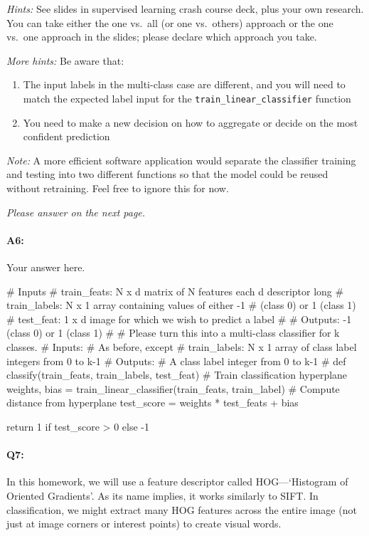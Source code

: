 \emph{Hints:} See slides in supervised learning crash course deck, plus your own research. You can take either the one vs.~all (or one vs.~others) approach or the one vs.~one approach in the slides; please declare which approach you take.

\emph{More hints:} Be aware that:
\begin{enumerate}
    \item The input labels in the multi-class case are different, and you will need to match the expected label input for the \texttt{train\_linear\_classifier} function
    \item You need to make a new decision on how to aggregate or decide on the most confident prediction
\end{enumerate}

\emph{Note:} A more efficient software application would separate the classifier training and testing into two different functions so that the model could be reused without retraining. Feel free to ignore this for now.

\emph{Please answer on the next page.}

\pagebreak
\paragraph{A6:} Your answer here.

\begin{python}
# Inputs
#   train_feats: N x d matrix of N features each d descriptor long
#   train_labels: N x 1 array containing values of either -1 
#               (class 0) or 1 (class 1)
#   test_feat: 1 x d image for which we wish to predict a label
#
#   Outputs: -1 (class 0) or 1 (class 1)
#
# Please turn this into a multi-class classifier for k classes.
# Inputs:
#    As before, except
#    train_labels: N x 1 array of class label integers from 0 to k-1
# Outputs:
#    A class label integer from 0 to k-1
#
def classify(train_feats, train_labels, test_feat)
    # Train classification hyperplane
    weights, bias = train_linear_classifier(train_feats, train_label)
    # Compute distance from hyperplane
    test_score = weights * test_feats + bias

    return 1 if test_score > 0 else -1
\end{python}


\pagebreak

\paragraph{Q7:} In this homework, we will use a feature descriptor called HOG---`Histogram of Oriented Gradients'. As its name implies, it works similarly to SIFT. In classification, we might extract many HOG features across the entire image (not just at image corners or interest points) to create visual words.

